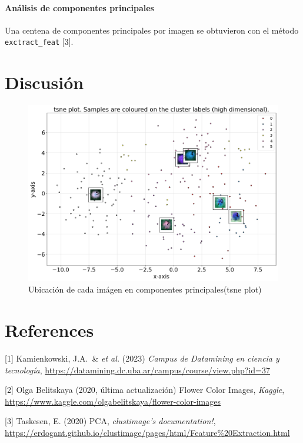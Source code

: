\documentclass{article}
\begin{document}


\paragraph{Análisis de componentes principales}
Una centena de componentes principales por imagen se obtuvieron con el método \verb'exctract_feat' [3].


\section{Discusión}

\begin{figure}
  \centering
  \includegraphics[width= 0.8\linewidth]{tsne}
  \caption{Ubicación de cada imágen en componentes principales(tsne plot)}
\end{figure}

\section*{References}

\medskip
{
\small

[1] Kamienkowski, J.A.\ \& \emph{et al.} (2023) {\it Campus de Datamining en ciencia y tecnología}, \url{https://datamining.dc.uba.ar/campus/course/view.php?id=37}

[2] Olga Belitskaya (2020, última actualización) Flower Color Images, {\it Kaggle}, \url{https://www.kaggle.com/olgabelitskaya/flower-color-images}

[3] Taskesen, E. (2020) PCA, {\it clustimage's documentation!}, \url{https://erdogant.github.io/clustimage/pages/html/Feature%20Extraction.html}
}
\end{document}
